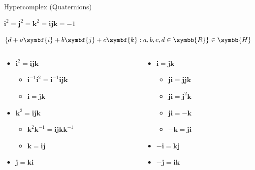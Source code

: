 \documentclass[aspectratio=169,t]{beamer}
\begin{document}
\begin{frame}[label={sec:org165ee9e}]{Hypercomplex (Quaternions)}
\begin{definition}[Quaternion]\label{sec:org0ab27ed}
\(\symbf{i}^2 = \symbf{j}^2 = \symbf{k}^2 = \symbf{ijk} = -1\)

\(\left\{ d + a\symbf{i} + b\symbf{j} + c\symbf{k} : a,b,c,d \in \symbb{R} \right\} \in \symbb{H}\)
\end{definition}

\begin{columns}
\begin{column}{0.50\columnwidth}
\begin{itemize}[<+->]
\item \(\symbf{i}^2 = \symbf{ijk}\)
\begin{itemize}
\item \(\symbf{i}^{-1} \symbf{i}^2 = \symbf{i}^{-1} \symbf{ijk}\)
\item \(\symbf{i} = \symbf{jk}\)
\end{itemize}
\item \(\symbf{k}^2 = \symbf{ijk}\)
\begin{itemize}
\item \(\symbf{k}^2 \symbf{k}^{-1} = \symbf{ijk} \symbf{k}^{-1}\)
\item \(\symbf{k} = \symbf{ij}\)
\end{itemize}
\item \(\symbf{j} = \symbf{ki}\)
\end{itemize}
\end{column}

\begin{column}{0.50\columnwidth}
\begin{itemize}[<+->]
\item \(\symbf{i} = \symbf{jk}\)
\begin{itemize}
\item \(\symbf{ji} = \symbf{jjk}\)
\item \(\symbf{ji} = \symbf{j}^2 \symbf{k}\)
\item \(\symbf{ji} = -\symbf{k}\)
\item \(-\symbf{k} = \symbf{ji}\)
\end{itemize}
\item \(-\symbf{i} = \symbf{kj}\)
\item \(-\symbf{j} = \symbf{ik}\)
\end{itemize}
\end{column}
\end{columns}
\end{frame}
\end{document}
